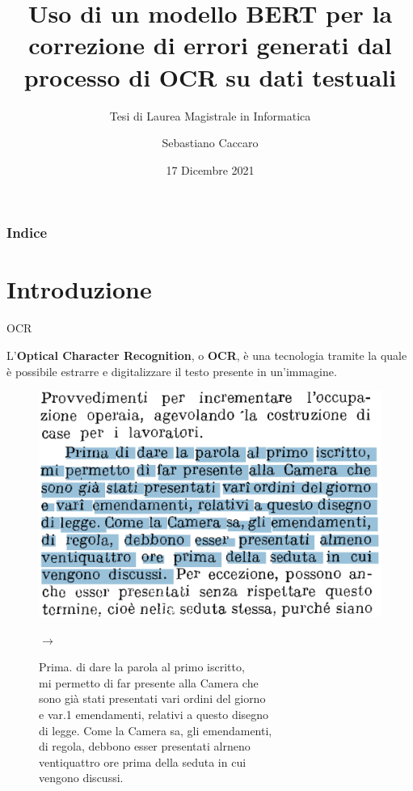 \documentclass{beamer}
\title{Uso di un modello BERT per la correzione di errori generati dal processo di OCR su dati testuali}
\subtitle{Tesi di Laurea Magistrale in Informatica}
\author{Sebastiano Caccaro}
\date{17 Dicembre 2021}
\begin{document}
	\maketitle


\begin{frame}
\frametitle{Indice}
\tableofcontents
\end{frame}


\section{Introduzione}

\begin{frame}{OCR}

		L'\textbf{Optical Character Recognition}, o \textbf{OCR}, è una tecnologia tramite la quale è possibile estrarre e digitalizzare il testo presente in un'immagine.

	\begin{figure}[H]
	\centering
	{
	\begin{minipage}{0.4\textwidth}
	\includegraphics[width=\textwidth]{images/slides/ocr_ex.png}
	\end{minipage} \hfill
	\begin{minipage}{0.06\textwidth}
	\Large$\rightarrow$
	\end{minipage}
	\begin{minipage}{0.51\textwidth}
	\fontsize{7.7}{6}\selectfont	
	Prima. di dare la parola al primo iscritto, \\
	mi permetto di far presente alla Camera che \\
	sono già stati presentati vari ordini del giorno \\
	e var.1 emendamenti, relativi a questo disegno \\
	di legge. Come la Camera sa, gli emendamenti, \\
	di regola, debbono esser presentati alrneno \\
	ventiquattro ore prima della seduta in cui \\
	vengono discussi.
	\end{minipage}
	}
	\end{figure}
\end{frame}
	
\end{document}
